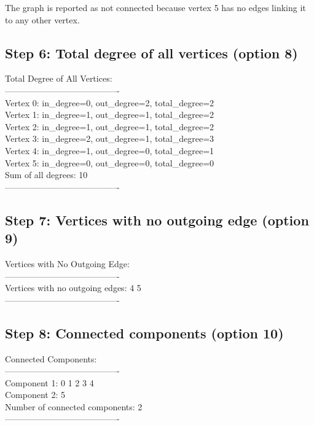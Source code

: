 \documentclass[11pt]{article}
\begin{document}
The graph is reported as not connected because vertex 5 has no edges linking it to any other vertex.

\subsection*{Step 6: Total degree of all vertices (option 8)}
\begin{terminal}
Total Degree of All Vertices:\\
----------------------------------------\\
Vertex 0: in\_degree=0, out\_degree=2, total\_degree=2\\
Vertex 1: in\_degree=1, out\_degree=1, total\_degree=2\\
Vertex 2: in\_degree=1, out\_degree=1, total\_degree=2\\
Vertex 3: in\_degree=2, out\_degree=1, total\_degree=3\\
Vertex 4: in\_degree=1, out\_degree=0, total\_degree=1\\
Vertex 5: in\_degree=0, out\_degree=0, total\_degree=0\\
Sum of all degrees: 10\\
----------------------------------------
\end{terminal}

\subsection*{Step 7: Vertices with no outgoing edge (option 9)}
\begin{terminal}
Vertices with No Outgoing Edge:\\
----------------------------------------\\
Vertices with no outgoing edges: 4 5\\
----------------------------------------
\end{terminal}

\subsection*{Step 8: Connected components (option 10)}
\begin{terminal}
Connected Components:\\
----------------------------------------\\
Component 1: 0 1 2 3 4\\
Component 2: 5\\
Number of connected components: 2\\
----------------------------------------
\end{terminal}
\end{document}
